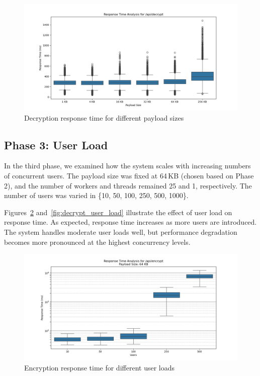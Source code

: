 \documentclass[cic,tc,english]{iiufrgs}
\begin{document}
            \begin{figure}
                \centering
                \includegraphics[width=\textwidth]{images/phase2/response_time_api_decrypt.png}
                \caption{Decryption response time for different payload sizes}
                \label{fig:decrypt_payload_size}
            \end{figure}

            \subsection{Phase 3: User Load}
            \label{subsec:phase3_userload}

            In the third phase, we examined how the system scales with increasing numbers of concurrent users. The payload size was fixed at 64\,KB (chosen based on Phase 2), and the number of workers and threads remained 25 and 1, respectively. The number of users was varied in \{10, 50, 100, 250, 500, 1000\}.

            Figures~\ref{fig:encrypt_user_load} and~\ref{fig:decrypt_user_load} illustrate the effect of user load on response time. As expected, response time increases as more users are introduced. The system handles moderate user loads well, but performance degradation becomes more pronounced at the highest concurrency levels.

            \begin{figure}
                \centering
                \includegraphics[width=\textwidth]{images/phase3/response_time_api_encrypt_64KB.png}
                \caption{Encryption response time for different user loads}
                \label{fig:encrypt_user_load}
            \end{figure}
\end{document}
